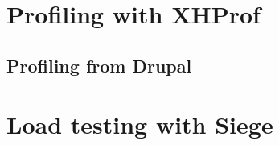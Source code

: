 \documentclass[draft,ebook,10pt,twoside,openright]{memoir}
\begin{document}

\section{Profiling with XHProf}

\subsection{Profiling from Drupal}

\section{Load testing with Siege}
\end{document}
